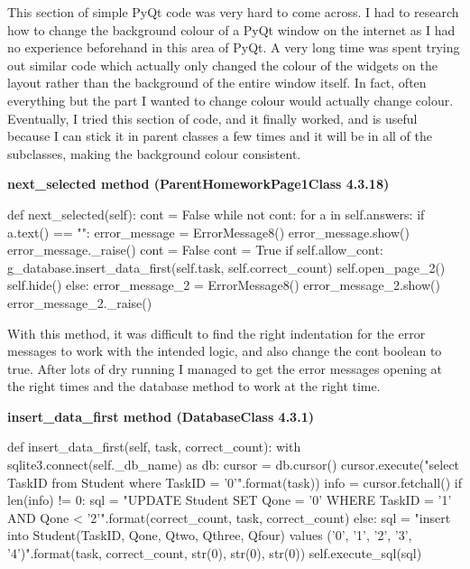This section of simple PyQt code was very hard to come across. I had to research how to change the background colour of a PyQt window on the internet as I had no experience beforehand in this area of PyQt. A very long time was spent trying out similar code which actually only changed the colour of the widgets on the layout rather than the background of the entire window itself. In fact, often everything but the part I wanted to change colour would actually change colour. Eventually, I tried this section of code, and it finally worked, and is useful because I can stick it in parent classes a few times and it will be in all of the subclasses, making the background colour consistent.

\textbf{next\_selected method (ParentHomeworkPage1Class 4.3.18)}

\begin{python}
def next_selected(self):
        cont = False
        while not cont:
            for a in self.answers:
                if a.text() == "":
                    error_message = ErrorMessage8()
                    error_message.show()
                    error_message._raise()
                    cont = False
            cont = True
            if self.allow_cont:
                g_database.insert_data_first(self.task, self.correct_count)
                self.open_page_2()
                self.hide()
            else:
                error_message_2 = ErrorMessage8()
                error_message_2.show()
                error_message_2._raise()
\end{python}

With this method, it was difficult to find the right indentation for the error messages to work with the intended logic, and also change the cont boolean to true. After lots of dry running I managed to get the error messages opening at the right times and the database method to work at the right time.

\textbf{insert\_data\_first method (DatabaseClass 4.3.1)}

\begin{python}
def insert_data_first(self, task, correct_count):
        with sqlite3.connect(self._db_name) as db:
            cursor = db.cursor()
            cursor.execute("select TaskID from Student where TaskID = '{0}'".format(task))
            info = cursor.fetchall()
            if len(info) != 0:
                sql = "UPDATE Student SET Qone = '{0}' WHERE TaskID = '{1}' AND Qone < '{2}'".format(correct_count, task, correct_count)
            else:
                sql = "insert into Student(TaskID, Qone, Qtwo, Qthree, Qfour) values ('{0}', '{1}', '{2}', '{3}', '{4}')".format(task, correct_count, str(0), str(0), str(0))
            self.execute_sql(sql)
\end{python}

